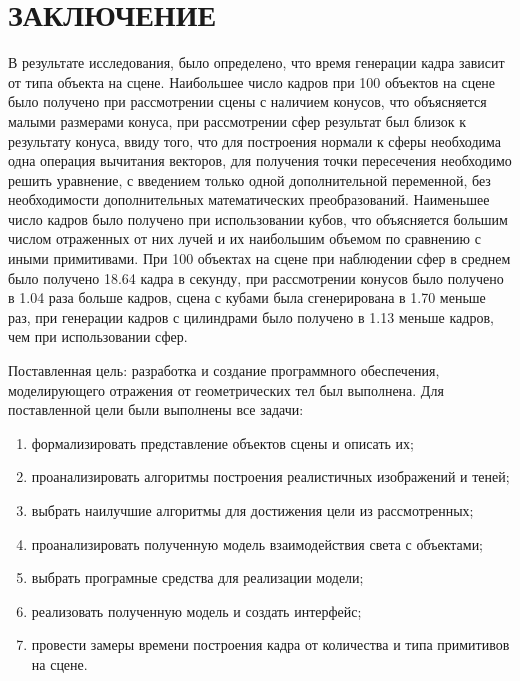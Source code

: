 \chapter*{\hfill{\centering  ЗАКЛЮЧЕНИЕ}\hfill}

В результате исследования, было определено, что время генерации кадра зависит от типа объекта на сцене. Наибольшее число кадров при 100 объектов на сцене было получено при рассмотрении сцены с наличием конусов, что объясняется малыми размерами конуса, при рассмотрении сфер результат был близок к результату конуса, ввиду того, что для построения нормали к сферы необходима одна операция вычитания векторов, для получения точки пересечения необходимо решить уравнение, с введением только одной дополнительной переменной, без необходимости дополнительных математических преобразований. Наименьшее число кадров было получено
при использовании кубов, что объясняется большим числом отраженных от них лучей и их наибольшим объемом по сравнению с иными примитивами. При 100 объектах на сцене при наблюдении сфер в среднем было получено 18.64 кадра в секунду, при рассмотрении конусов было получено в 1.04 раза больше кадров, сцена с кубами была сгенерирована  в 1.70 меньше раз, при генерации кадров с цилиндрами было получено  в 1.13 меньше кадров, чем при использовании сфер.

Поставленная цель: разработка и создание программного обеспечения, моделирующего отражения от геометрических тел был выполнена.
Для поставленной цели были выполнены все задачи:
\begin{enumerate}
	\item формализировать представление объектов сцены и описать их;
	\item проанализировать алгоритмы построения реалистичных изображений и теней;
	\item выбрать наилучшие алгоритмы для достижения цели  из рассмотренных;
	\item проанализировать полученную  модель взаимодействия света с объектами;
	\item выбрать програмные средства для реализации модели;
	\item реализовать полученную модель и создать интерфейс;
	\item провести замеры времени построения кадра от количества и типа примитивов на сцене.
\end{enumerate}